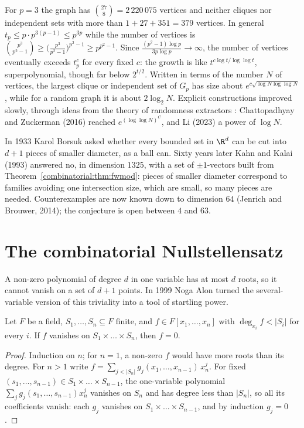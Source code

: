 For $p=3$ the graph has $\binom{27}8=2\,220\,075$ vertices and neither cliques nor independent sets with more than $1+27+351=379$ vertices. In general $t_p\le p\cdot p^{3(p-1)}\le p^{3p}$ while the number of vertices is
$\binom{p^3}{p^2-1}\ge\bigl(\frac{p^3}{p^2-1}\bigr)^{p^2-1}\ge p^{p^2-1}$. Since $\frac{(p^2-1)\log p}{3p\log p}\to\infty$, the number of vertices eventually exceeds $t_p^c$ for every fixed $c$: the growth is like $t^{c\log t/\log\log t}$,
superpolynomial, though far below $2^{t/2}$. Written in terms of the number $N$ of vertices, the largest clique or independent set of $G_p$ has size about $e^{c\sqrt{\log N\log\log N}}$, while for a random graph it is about $2\log_2N$. Explicit constructions
improved slowly, through ideas from the theory of randomness extractors : Chattopadhyay and Zuckerman (2016) reached $e^{(\log\log N)^{C}}$, and Li (2023) a power of $\log N$.

\begin{remark}
In 1933 Karol Borsuk asked whether every bounded set in $\R^d$ can be cut into $d+1$ pieces of smaller diameter, as a ball can. Sixty years later Kahn and Kalai (1993) answered no, in dimension $1325$,
with a set of $\pm1$-vectors built from Theorem~\ref{combinatorial:thm:fwmod}: pieces of smaller diameter correspond to families avoiding one intersection size, which are small, so many pieces are needed. Counterexamples are
now known down to dimension $64$ (Jenrich and Brouwer, 2014); the conjecture is open between $4$ and $63$.
\end{remark}

\section{The combinatorial Nullstellensatz}

A non-zero polynomial of degree $d$ in one variable has at most $d$ roots, so it cannot vanish on a set of $d+1$ points. In 1999 Noga Alon turned the several-variable version of this triviality into a tool
of startling power.

\begin{lemma}\label{combinatorial:lem:grid}
Let $F$ be a field, $S_1,\dots,S_n\subseteq F$ finite, and $f\in F[x_1,\dots,x_n]$ with $\deg_{x_i}f<|S_i|$ for every $i$. If $f$ vanishes on $S_1\times\dots\times S_n$, then $f=0$.
\end{lemma}
\begin{proof}
Induction on $n$; for $n=1$, a non-zero $f$ would have more roots than its degree. For $n>1$ write $f=\sum_{j<|S_n|}g_j(x_1,\dots,x_{n-1})\,x_n^j$. For fixed $(s_1,\dots,s_{n-1})\in S_1\times\dots\times S_{n-1}$,
the one-variable polynomial $\sum_jg_j(s_1,\dots,s_{n-1})x_n^j$ vanishes on $S_n$ and has degree less than $|S_n|$, so all its coefficients vanish: each $g_j$ vanishes on $S_1\times\dots\times S_{n-1}$, and by induction $g_j=0$.
\end{proof}

